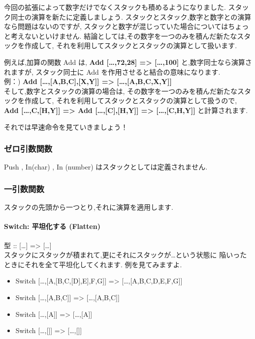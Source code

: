 今回の拡張によって数字だけでなくスタックも積めるようになりました.
スタック同士の演算を新たに定義しましょう.
スタックとスタック,数字と数字との演算なら問題はないのですが,
スタックと数字が混じっていた場合についてはちょっと考えないといけません.
結論としては,その数字を一つのみを積んだ新たなスタックを作成して,
それを利用してスタックとスタックの演算として扱います.

例えば,加算の関数 Add は, \textbf{Add {[}\ldots{},72,28{]}
=\textgreater{} {[}\ldots{},100{]}} と,数字同士なら演算されますが,
スタック同士に Add を作用させると結合の意味になります.\\例：) \textbf{Add
{[}\ldots{},{[}A,B,C{]},{[}X,Y{]}{]} =\textgreater{}
{[}\ldots{},{[}A,B,C,X,Y{]}{]}}\\そして,数字とスタックの演算の場合は,
その数字を一つのみを積んだ新たなスタックを作成して,
それを利用してスタックとスタックの演算として扱うので, \textbf{Add
{[}\ldots{},C,{[}H,Y{]}{]} =\textgreater{} Add
{[}\ldots{},{[}C{]},{[}H,Y{]}{]} =\textgreater{}
{[}\ldots{},{[}C,H,Y{]}{]}} と計算されます.

それでは早速命令を見ていきましょう！

\subsubsection{ゼロ引数関数}

Push , In(char) , In (number) はスタックとしては定義されません.

\subsubsection{一引数関数}

スタックの先頭から一つとり,それに演算を適用します.

\paragraph{Switch: 平坦化する (Flatten)}

型 :: {[}\ldots{}{]} =\textgreater{}
{[}\ldots{}{]}\\スタックにスタックが積まれて,更にそれにスタックが\ldots{}という状態に
陥いったときにそれを全て平坦化してくれます. 例を見てみますよ.

\begin{itemize}
\item
  Switch {[}\ldots{},{[}A,{[}B,C,{[}D{]},E{]},F,G{]}{]} =\textgreater{}
  {[}\ldots{},{[}A,B,C,D,E,F,G{]}{]}
\item
  Switch {[}\ldots{},{[}A,B,C{]}{]} =\textgreater{}
  {[}\ldots{},{[}A,B,C{]}{]}
\item
  Switch {[}\ldots{},{[}A{]}{]} =\textgreater{} {[}\ldots{},{[}A{]}{]}
\item
  Switch {[}\ldots{},{[}{]}{]} =\textgreater{} {[}\ldots{},{[}{]}{]}
\end{itemize}

